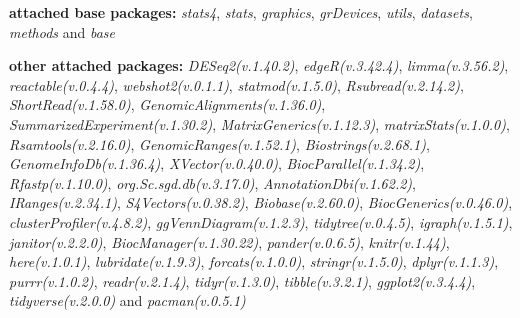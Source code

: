 \documentclass[
]{book}
\begin{document}
\textbf{attached base packages:}
\emph{stats4}, \emph{stats}, \emph{graphics}, \emph{grDevices}, \emph{utils}, \emph{datasets}, \emph{methods} and \emph{base}

\textbf{other attached packages:}
\emph{DESeq2(v.1.40.2)}, \emph{edgeR(v.3.42.4)}, \emph{limma(v.3.56.2)}, \emph{reactable(v.0.4.4)}, \emph{webshot2(v.0.1.1)}, \emph{statmod(v.1.5.0)}, \emph{Rsubread(v.2.14.2)}, \emph{ShortRead(v.1.58.0)}, \emph{GenomicAlignments(v.1.36.0)}, \emph{SummarizedExperiment(v.1.30.2)}, \emph{MatrixGenerics(v.1.12.3)}, \emph{matrixStats(v.1.0.0)}, \emph{Rsamtools(v.2.16.0)}, \emph{GenomicRanges(v.1.52.1)}, \emph{Biostrings(v.2.68.1)}, \emph{GenomeInfoDb(v.1.36.4)}, \emph{XVector(v.0.40.0)}, \emph{BiocParallel(v.1.34.2)}, \emph{Rfastp(v.1.10.0)}, \emph{org.Sc.sgd.db(v.3.17.0)}, \emph{AnnotationDbi(v.1.62.2)}, \emph{IRanges(v.2.34.1)}, \emph{S4Vectors(v.0.38.2)}, \emph{Biobase(v.2.60.0)}, \emph{BiocGenerics(v.0.46.0)}, \emph{clusterProfiler(v.4.8.2)}, \emph{ggVennDiagram(v.1.2.3)}, \emph{tidytree(v.0.4.5)}, \emph{igraph(v.1.5.1)}, \emph{janitor(v.2.2.0)}, \emph{BiocManager(v.1.30.22)}, \emph{pander(v.0.6.5)}, \emph{knitr(v.1.44)}, \emph{here(v.1.0.1)}, \emph{lubridate(v.1.9.3)}, \emph{forcats(v.1.0.0)}, \emph{stringr(v.1.5.0)}, \emph{dplyr(v.1.1.3)}, \emph{purrr(v.1.0.2)}, \emph{readr(v.2.1.4)}, \emph{tidyr(v.1.3.0)}, \emph{tibble(v.3.2.1)}, \emph{ggplot2(v.3.4.4)}, \emph{tidyverse(v.2.0.0)} and \emph{pacman(v.0.5.1)}
\end{document}
